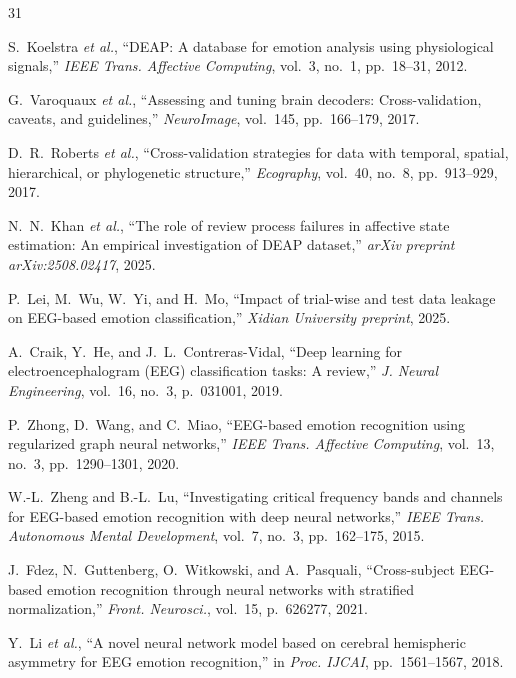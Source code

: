 \documentclass[conference,a4paper]{IEEEtran}
\begin{document}
\begin{thebibliography}{31}
\setlength{\itemsep}{0pt plus 0.2ex}
\setlength{\parsep}{0pt}

S.~Koelstra \emph{et al.}, ``DEAP: A database for emotion analysis using physiological signals,'' \emph{IEEE Trans. Affective Computing}, vol.~3, no.~1, pp.~18--31, 2012.

G.~Varoquaux \emph{et al.}, ``Assessing and tuning brain decoders: Cross-validation, caveats, and guidelines,'' \emph{NeuroImage}, vol.~145, pp.~166--179, 2017.

D.~R.~Roberts \emph{et al.}, ``Cross-validation strategies for data with temporal, spatial, hierarchical, or phylogenetic structure,'' \emph{Ecography}, vol.~40, no.~8, pp.~913--929, 2017.

N.~N.~Khan \emph{et al.}, ``The role of review process failures in affective state estimation: An empirical investigation of DEAP dataset,'' \emph{arXiv preprint arXiv:2508.02417}, 2025.

P.~Lei, M.~Wu, W.~Yi, and H.~Mo, ``Impact of trial-wise and test data leakage on EEG-based emotion classification,'' \emph{Xidian University preprint}, 2025.

A.~Craik, Y.~He, and J.~L.~Contreras-Vidal, ``Deep learning for electroencephalogram (EEG) classification tasks: A review,'' \emph{J. Neural Engineering}, vol.~16, no.~3, p.~031001, 2019.

P.~Zhong, D.~Wang, and C.~Miao, ``EEG-based emotion recognition using regularized graph neural networks,'' \emph{IEEE Trans. Affective Computing}, vol.~13, no.~3, pp.~1290--1301, 2020.

W.-L.~Zheng and B.-L.~Lu, ``Investigating critical frequency bands and channels for EEG-based emotion recognition with deep neural networks,'' \emph{IEEE Trans. Autonomous Mental Development}, vol.~7, no.~3, pp.~162--175, 2015.

J.~Fdez, N.~Guttenberg, O.~Witkowski, and A.~Pasquali, ``Cross-subject EEG-based emotion recognition through neural networks with stratified normalization,'' \emph{Front. Neurosci.}, vol.~15, p.~626277, 2021.

Y.~Li \emph{et al.}, ``A novel neural network model based on cerebral hemispheric asymmetry for EEG emotion recognition,'' in \emph{Proc. IJCAI}, pp.~1561--1567, 2018.


\end{thebibliography}
\end{document}
